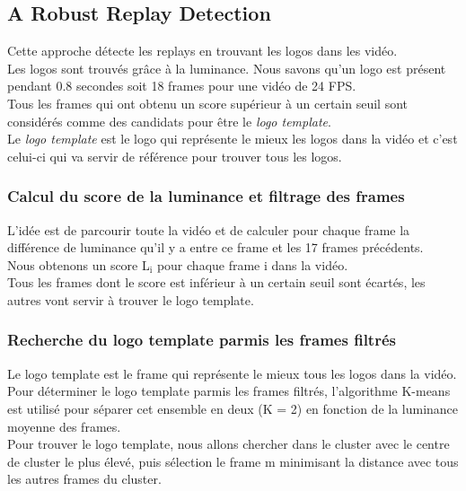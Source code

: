 \documentclass[11pt]{article}
\begin{document}
\subsection{A Robust Replay Detection}
\label{sec:org39e415f}
Cette approche \cite{xu11_robus_replay_detec_algor_soccer_video} détecte les replays en trouvant les logos dans les vidéo.\\
Les logos sont trouvés grâce à la luminance. Nous savons qu'un logo est présent pendant 0.8 secondes soit 18 frames pour une vidéo de 24 FPS.\\
Tous les frames qui ont obtenu un score supérieur à un certain seuil sont considérés comme des candidats pour être le \emph{logo template}.\\
Le \emph{logo template} est le logo qui représente le mieux les logos dans la vidéo et c'est celui-ci qui va servir de référence pour trouver tous les logos.\\

\subsubsection{Calcul du score de la luminance et filtrage des frames}
\label{sec:org0109f3a}
L'idée est de parcourir toute la vidéo et de calculer pour chaque frame la différence de luminance qu'il y a entre ce frame et les 17 frames précédents.\\
Nous obtenons un score L\(_{\text{i}}\) pour chaque frame i dans la vidéo.\\
Tous les frames dont le score est inférieur à un certain seuil sont écartés, les autres vont servir à trouver le logo template.\\

\subsubsection{Recherche du logo template parmis les frames filtrés}
\label{sec:orge18753a}
Le logo template est le frame qui représente le mieux tous les logos dans la vidéo.\\
Pour déterminer le logo template parmis les frames filtrés, l'algorithme K-means est utilisé pour séparer cet ensemble en deux (K = 2) en fonction de la luminance moyenne des frames.\\
Pour trouver le logo template, nous allons chercher dans le cluster avec le centre de cluster le plus élevé, puis sélection le frame m minimisant la distance avec tous les autres frames du cluster.\\
\end{document}
